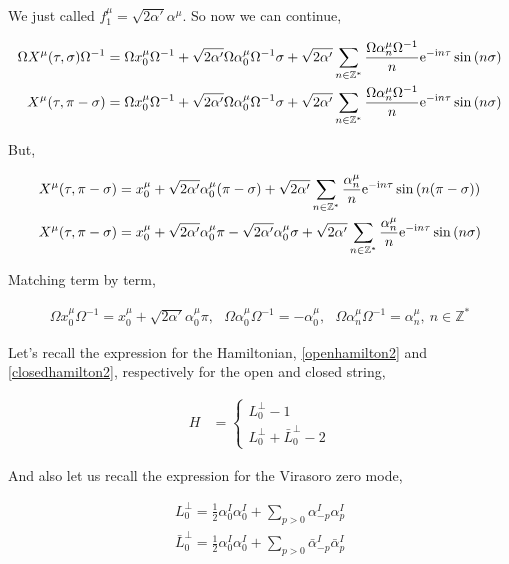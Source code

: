 We just called $f_1^\mu=\sqrt{2\alpha'}\alpha^\mu$. So now we can continue,

\begin{align*}
    \Omega X^\mu\qty(\tau,\sigma)\Omega^{-1}&=\Omega x_0^\mu\Omega^{-1}+\sqrt{2\alpha'}\Omega\alpha_0^\mu\Omega^{-1}\sigma+\sqrt{2\alpha'}\sum\limits_{n\in\mathbb Z^\ast}\frac{\Omega\alpha_n^\mu\Omega^{-1}}{n}\textnormal{e}^{-\textnormal{i} n \tau}\sin\qty(n\sigma)\\
    X^\mu\qty(\tau,\pi-\sigma)&=\Omega x_0^\mu\Omega^{-1}+\sqrt{2\alpha'}\Omega\alpha_0^\mu\Omega^{-1}\sigma+\sqrt{2\alpha'}\sum\limits_{n\in\mathbb Z^\ast}\frac{\Omega\alpha_n^\mu\Omega^{-1}}{n}\textnormal{e}^{-\textnormal{i} n \tau}\sin\qty(n\sigma)
\end{align*}

But,

\begin{align*}
    X^\mu\qty(\tau,\pi-\sigma)&=x_0^\mu+\sqrt{2\alpha'}\alpha_0^\mu\qty(\pi-\sigma)+\sqrt{2\alpha'}\sum\limits_{n\in\mathbb Z^\ast}\frac{\alpha_n^\mu}{n}\textnormal{e}^{-\textnormal{i} n \tau}\sin\qty(n\qty(\pi-\sigma))\\
    X^\mu\qty(\tau,\pi-\sigma)&=x_0^\mu+\sqrt{2\alpha'}\alpha_0^\mu\pi-\sqrt{2\alpha'}\alpha_0^\mu\sigma+\sqrt{2\alpha'}\sum\limits_{n\in\mathbb Z^\ast}\frac{\alpha_n^\mu}{n}\textnormal{e}^{-\textnormal{i} n \tau}\sin\qty(n\sigma)
\end{align*}

Matching term by term,

\begin{align*}
    \Omega x_0^\mu\Omega^{-1}=x_0^\mu+\sqrt{2\alpha'}\alpha_0^\mu\pi,\ \ \ \Omega \alpha_0^\mu\Omega^{-1}=-\alpha_0^\mu,\ \ \ \Omega \alpha_n^\mu\Omega^{-1}=\alpha_n^\mu,\ n\in\mathbb Z^\ast
\end{align*}

\probitem{}

Let's recall the expression for the Hamiltonian, \ref{openhamilton2} and \ref{closedhamilton2}, respectively for 
the open and closed string,

\begin{align*}
    H&=\begin{cases}
        L_0^\perp-1\\L_0^\perp+{\bar L}_0^\perp-2
    \end{cases}
\end{align*}

And also let us recall the expression for the Virasoro zero mode,

\begin{align*}
    L^\perp_0=\frac12\alpha_0^I\alpha_0^I+\sum\limits_{p>0}\alpha^I_{-p}\alpha^I_p\\
    {\bar L}^\perp_0=\frac12\alpha_0^I\alpha_0^I+\sum\limits_{p>0}{\bar \alpha}^I_{-p}{\bar\alpha}^I_p
\end{align*}

